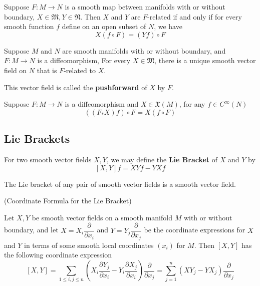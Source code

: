 \begin{proposition}
    Suppose $F:M\to N$ is a smooth map between manifolds with or without boundary, $X\in\mathfrak{M}, Y \in \mathfrak{N}$. Then $X$ and $Y$ are $F$-related if and only if for every smooth function $f$ define on an open subset of $N$, we have
    \[X(f\circ F) = (Yf)\circ F\]
\end{proposition}

\begin{proposition}
    Suppose $M$ and $N$ are smooth manifolds with or without boundary, and $F:M\to N$ is a diffeomorphism, For every $X\in\mathfrak{M}$, there is a unique smooth vector field on $N$ that is $F$-related to $X$.\par
    This vector field is called the \textbf{pushforward} of $X$ by $F$.
\end{proposition}

\begin{corollary}
    Suppose $F:M\to N$ is a diffeomorphism and $X\in\mathfrak{X}(M)$, for any $f\in C^{\infty}(N)$
    \[((F_*X)f)\circ F = X(f\circ F)\]
\end{corollary}

\subsection{Lie Brackets}

\begin{definition}
    For two smooth vector fields $X,Y$, we may define the \textbf{Lie Bracket} of $X$ and $Y$ by
    \[[X,Y]f = XYf - YXf\]
\end{definition}

\begin{lemma}
    The Lie bracket of any pair of smooth vector fields is a smooth vector field.
\end{lemma}

\begin{proposition}(Coordinate Formula for the Lie Bracket)\par
    Let $X,Y$ be smooth vector fields on a smooth manifold $M$ with or without boundary, and let $X = X_i\dfrac{\partial}{\partial x_i}$ and $Y = Y_j\dfrac{\partial}{\partial x_j}$ be the coordinate expressions for $X$ and $Y$ in terms of some smooth local coordinates $(x_i)$ for $M$. Then $[X,Y]$ has the following coordinate expression
    \[[X,Y] = \sum\limits_{1\leq i,j\leq n}\left(X_i\dfrac{\partial Y_j}{\partial x_i} - Y_i\dfrac{\partial X_j}{\partial x_i}\right)\dfrac{\partial}{\partial x_j} = \sum\limits_{j=1}^n(XY_j - YX_j)\dfrac{\partial}{\partial x_j}\]
\end{proposition}

